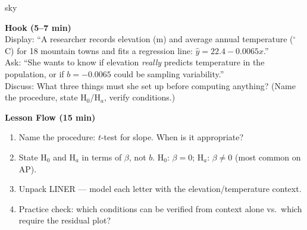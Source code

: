 \documentclass[10pt]{article}
\begin{document}
\begin{skillbox}{sky}
\begin{minipage}[t]{0.48\linewidth}
    \textbf{Hook (5--7 min)}\\
    Display: ``A researcher records elevation (m) and average annual temperature
    ($^\circ$C) for 18 mountain towns and fits a regression line:
    $\hat{y} = 22.4 - 0.0065x$.''\\[4pt]
    Ask: ``She wants to know if elevation \emph{really} predicts temperature in the
    population, or if $b = -0.0065$ could be sampling variability.''\\[4pt]
    Discuss: What three things must she set up before computing anything?
    (Name the procedure, state H$_0$/H$_a$, verify conditions.)
\end{minipage}
\hfill
\begin{minipage}[t]{0.48\linewidth}
    \textbf{Lesson Flow (15 min)}
    \begin{enumerate}
        \item Name the procedure: $t$-test for slope. When is it appropriate?
        \item State H$_0$ and H$_a$ in terms of $\beta$, not $b$.
              H$_0$: $\beta = 0$; H$_a$: $\beta \ne 0$ (most common on AP).
        \item Unpack LINER --- model each letter with the elevation/temperature context.
        \item Practice check: which conditions can be verified from context alone vs.\
              which require the residual plot?
    \end{enumerate}
\end{minipage}
\end{skillbox}
\end{document}
